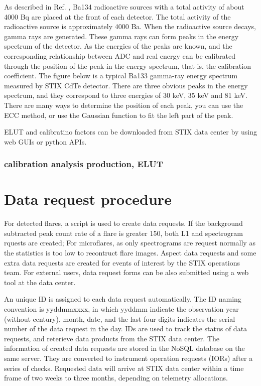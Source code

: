 \documentclass{aa}
\begin{document}
As described in Ref. \cite{StixInstrument},  Ba134 radioactive sources with a total activity of about 4000 Bq are placed at the front of each detector. The total activity of the radioactive source is approximately 4000 Ba.
When the radioactive source decays, gamma rays are generated. These gamma rays can form peaks in the energy spectrum of the detector.
As the energies of the peaks are known, and the corresponding relationship between ADC and real energy can be calibrated through the position of the peak in the energy spectrum, that is, the calibration coefficient. The figure below is a typical Ba133 gamma-ray energy spectrum measured by STIX CdTe detector. There are three obvious peaks in the energy spectrum, and they correspond to three energies of 30 keV, 35 keV and 81 keV. There are many ways to determine the position of each peak, you can use the ECC method, or use the Gaussian function to fit the left part of the peak.


ELUT and calibratino factors can be downloaded from STIX data center by using web GUIs or python APIs.
\subsubsection{calibration analysis production, ELUT}

\section{Data request procedure}

For detected flares,  a script is used to create data requests.
If the background subtracted peak count rate of a flare is greater 150,
both L1 and spectrogram rquests are created;  For microflares, as only
spectrograms are request normally as the statistics is too
low to recontruct flare images.  Aspect data requests
and some extra data requests are created for events of interest by the
STIX operations team.
For external users, data request forms can be also submitted using a web tool
at the data center.

An unique ID is assigned to each data request automatically.
The ID naming convention is yyddmmxxxx, in which yyddmm indicate the observation year (without century), month, date,
and the last four digits indicates the serial number of the data request in the day.
IDs are used to track the status of data requests, and reterieve data products from the
STIX data center.
The information of created data requests are stored in the NoSQL database on the same server.
They are converted to instrument operation requests (IORs) after a series of checks.
Requested data will arrive at STIX data center within a time frame of two weeks to three months, depending on
telemetry allocations.
\end{document}
